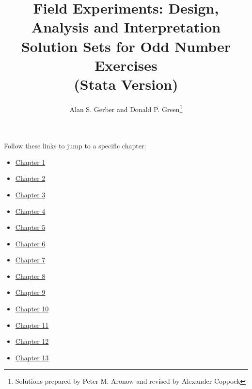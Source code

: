 \documentclass[11pt,notitlepage]{article}\usepackage[]{graphicx}\usepackage[]{color}
\begin{document}
\title{Field Experiments: Design, Analysis and Interpretation \\
Solution Sets for Odd Number Exercises\\(Stata Version)}
\author{Alan S. Gerber and Donald P. Green\footnote{Solutions prepared by Peter M. Aronow and revised by Alexander Coppock}}
\date{\vspace{-5ex}}

\maketitle
Follow these links to jump to a specific chapter:
\begin{itemize}
\item \hyperlink{page.2}{Chapter 1}
\item \hyperlink{page.4}{Chapter 2}
\item \hyperlink{page.10}{Chapter 3}
\item \hyperlink{page.25}{Chapter 4}
\item \hyperlink{page.40}{Chapter 5}
\item \hyperlink{page.49}{Chapter 6}
\item \hyperlink{page.54}{Chapter 7}
\item \hyperlink{page.59}{Chapter 8}
\item \hyperlink{page.70}{Chapter 9}
\item \hyperlink{page.86}{Chapter 10}
\item \hyperlink{page.98}{Chapter 11}
\item \hyperlink{page.105}{Chapter 12}
\item \hyperlink{page.120}{Chapter 13}
\end{itemize}

















\end{document}
